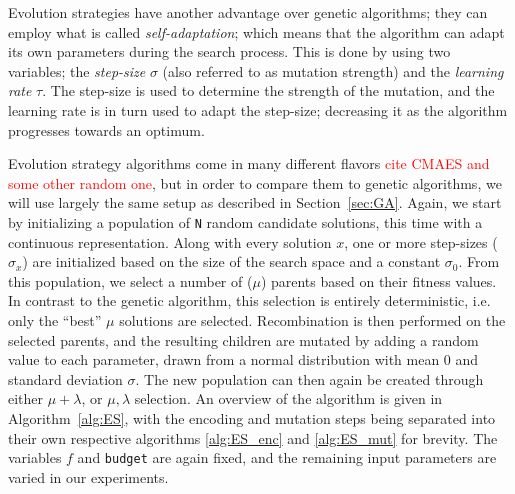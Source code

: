 \documentclass{article}
\newcommand{\todo}[1]{\textcolor{red}{#1}}
\begin{document}
Evolution strategies have another advantage over genetic algorithms; they can employ what is called \textit{self-adaptation}; which means that the algorithm can adapt its own parameters during the search process.
This is done by using two variables; the \textit{step-size} $\sigma$ (also referred to as mutation strength) and the \textit{learning rate} $\tau$.
The step-size is used to determine the strength of the mutation, and the learning rate is in turn used to adapt the step-size; decreasing it as the algorithm progresses towards an optimum.

\newpage

Evolution strategy algorithms come in many different flavors \todo{cite CMAES and some other random one}, but in order to compare them to genetic algorithms, we will use largely the same setup as described in Section~\ref{sec:GA}.
Again, we start by initializing a population of \texttt{N} random candidate solutions, this time with a continuous representation.
Along with every solution $x$, one or more step-sizes ($\sigma_x$) are initialized based on the size of the search space and a constant $\sigma_0$.
From this population, we select a number of ($\mu$) parents based on their fitness values.
In contrast to the genetic algorithm, this selection is entirely deterministic, i.e. only the ``best'' $\mu$ solutions are selected.
Recombination is then performed on the selected parents, and the resulting children are mutated by adding a random value to each parameter, drawn from a normal distribution with mean 0 and standard deviation $\sigma$.
The new population can then again be created through either $\mu+\lambda$, or $\mu,\lambda$ selection.
An overview of the algorithm is given in Algorithm~\ref{alg:ES}, with the encoding and mutation steps being separated into their own respective algorithms \ref{alg:ES_enc} and \ref{alg:ES_mut} for brevity.
The variables $f$ and \texttt{budget} are again fixed, and the remaining input parameters are varied in our experiments.

\end{document}
